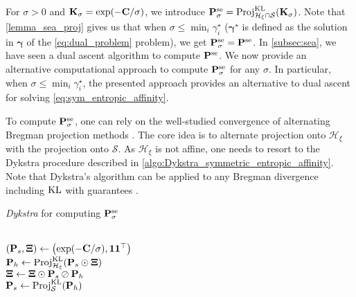 For $\sigma > 0$ and $\mathbf{K}_{\sigma} = \exp(-\mathbf{C}/\sigma)$, we introduce $\mathbf{P}^{\mathrm{se}}_{\sigma} = \operatorname{Proj}^{\operatorname{\operatorname{KL}}}_{\mathcal{H}_{\xi} \cap \mathcal{S}}(\mathbf{K}_{\sigma})$. Note that \cref{lemma_sea_proj} gives us that when $\sigma \leq \min_i \gamma^\star_i$ ($\bm{\gamma}^\star$ is defined as the solution in $\bm{\gamma}$ of the \ref{eq:dual_problem} problem), we get $\mathbf{P}^{\mathrm{se}}_{\sigma} = \mathbf{P}^{\mathrm{se}}$. In \cref{subsec:sea}, we have seen a dual ascent algorithm to compute $\mathbf{P}^{\mathrm{se}}$. We now provide an alternative computational approach to compute $\mathbf{P}^{\mathrm{se}}_{\sigma}$ for any $\sigma$. In particular, when $\sigma \leq \min_i \gamma^\star_i$, the presented approach provides an alternative to dual ascent for solving \eqref{eq:sym_entropic_affinity}.

To compute $\mathbf{P}^{\mathrm{se}}_{\sigma}$, one can rely on the well-studied convergence of alternating Bregman projection methods \cite{benamou2015iterative}. The core idea is to alternate projection onto $\mathcal{H}_{\xi}$  with the projection onto $\mathcal{S}$. As $\mathcal{H}_{\xi}$ is not affine, one needs to resort to the Dykstra procedure \cite{dykstra1983algorithm} described in \cref{algo:Dykstra_symmetric_entropic_affinity}. Note that Dykstra's algorithm can be applied to any Bregman divergence including $\operatorname{KL}$ \cite{censor1998dykstra} with guarantees \cite{bauschke2000dykstras}. 

\begin{algorithm}[H]
    \caption{\textit{Dykstra} for computing  $\mathbf{P}^{\mathrm{se}}_{\sigma}$}
    \label{algo:Dykstra_symmetric_entropic_affinity}
    \begin{algorithmic}[1]
         \\
        \STATE $\left(\mathbf{P}_s, \bm{\Xi} \right) \leftarrow \left(\exp(-\mathbf{C} / \sigma), \bm{1} \bm{1}^\top \right)$ \\
            \STATE $\mathbf{P}_h \leftarrow \operatorname{Proj}^{\operatorname{KL}}_{\mathcal{H}_{\xi}}(\mathbf{P}_s \odot \bm{\Xi})$ 
            \\
            \STATE $\bm{\Xi} \leftarrow \bm{\Xi} \odot \mathbf{P}_s \oslash \mathbf{P}_h$
            \\
            \STATE $\mathbf{P}_s \leftarrow \operatorname{Proj}^{\operatorname{KL}}_{\mathcal{S}}(\mathbf{P}_h)$
        \ENDWHILE  
\end{algorithmic}
\end{algorithm}
    
